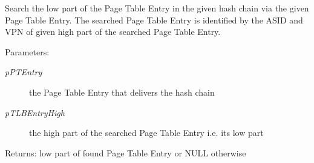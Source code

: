 Search the low part of the Page Table Entry in the given hash chain via the given Page Table Entry. The searched Page Table Entry is identified by the ASID and VPN of given high part of the searched Page Table Entry. \begin{Desc}
\item[Parameters:]
\begin{description}
\item[{\em pPTEntry}]the Page Table Entry that delivers the hash chain \item[{\em pTLBEntryHigh}]the high part of the searched Page Table Entry i.e. its low part \end{description}
\end{Desc}
\begin{Desc}
\item[Returns:]low part of found Page Table Entry or NULL otherwise \end{Desc}
